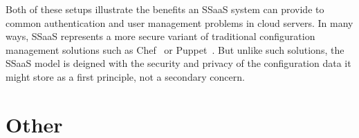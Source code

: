 Both of these setups illustrate the benefits an SSaaS system can
provide to common authentication and user management problems in cloud
servers. In many ways, SSaaS represents a more secure variant of
traditional configuration management solutions such as
Chef~\cite{chef} or Puppet~\cite{puppet}. But unlike such solutions,
the SSaaS model is deigned with the security and privacy of the
configuration data it might store as a first principle, not a
secondary concern.

\section{Other}

